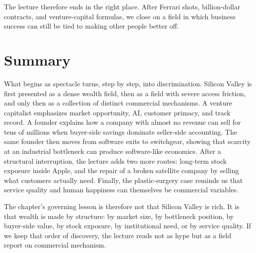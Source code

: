 The lecture therefore ends in the right place. After Ferrari shots, billion-dollar contracts, and venture-capital formulas, we close on a field in which business success can still be tied to making other people better off.

\section{Summary}

What begins as spectacle turns, step by step, into discrimination. Silicon Valley is first presented as a dense wealth field, then as a field with severe access friction, and only then as a collection of distinct commercial mechanisms. A venture capitalist emphasizes market opportunity, AI, customer primacy, and track record. A founder explains how a company with almost no revenue can sell for tens of millions when buyer-side savings dominate seller-side accounting. The same founder then moves from software exits to switchgear, showing that scarcity at an industrial bottleneck can produce software-like economics. After a structural interruption, the lecture adds two more routes: long-term stock exposure inside Apple, and the repair of a broken satellite company by selling what customers actually need. Finally, the plastic-surgery case reminds us that service quality and human happiness can themselves be commercial variables.

The chapter's governing lesson is therefore not that Silicon Valley is rich. It is that wealth is made by structure: by market size, by bottleneck position, by buyer-side value, by stock exposure, by institutional need, or by service quality. If we keep that order of discovery, the lecture reads not as hype but as a field report on commercial mechanism.
